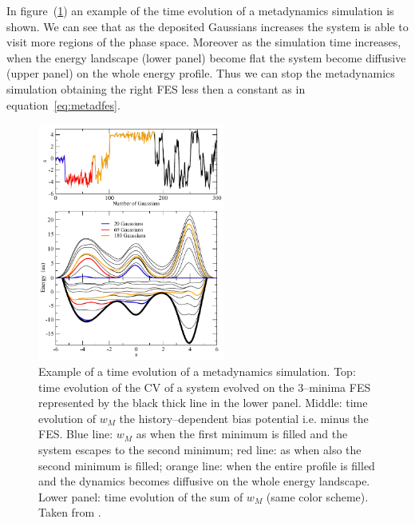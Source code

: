 In figure~(\ref{fig:metadEs}) an example of the time evolution of a metadynamics simulation is shown. We can see that as the deposited Gaussians increases the system is able to visit more regions of the phase space. Moreover as the simulation time increases, when the energy landscape (lower panel) become flat the system become diffusive (upper panel) on the whole energy profile. Thus we can stop the metadynamics simulation obtaining the right \ac{FES} less then a constant as in equation~\eqref{eq:metadfes}. 
\begin{figure}
	\centering
	\includegraphics[width=0.55\textwidth]{./img/metadEs}
	\caption{Example of a time evolution of a metadynamics simulation. Top: time evolution of the \acs{CV} of a system evolved on the 3--minima \acs{FES} represented by the black thick line in the lower panel. Middle: time evolution of $w_M$ the history--dependent bias potential i.e. minus the \acs{FES}. Blue line: $w_M$ as when the first minimum is filled and the system escapes to the second minimum; red line: as when also the second minimum is filled; orange line: when the entire profile is filled and the dynamics becomes diffusive on the whole energy landscape. Lower panel: time evolution of the sum of $w_M$ (same color scheme). Taken from \cite{MetadReview}.}
	\label{fig:metadEs}
\end{figure}

